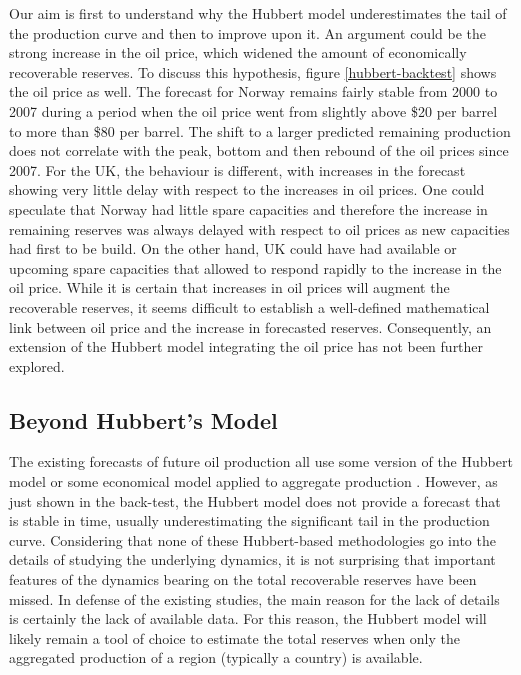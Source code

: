 \documentclass[review]{elsarticle}
\begin{document}
Our aim is first to understand why the Hubbert model underestimates the tail of the production curve and then to improve upon it. An argument could be the strong increase in the oil price, which widened the amount of economically recoverable reserves. To discuss this hypothesis, figure \ref{hubbert-backtest} shows the oil price as well. The forecast for Norway remains fairly stable from 2000 to 2007 during a period when the oil
price went from slightly above \$20 per barrel to more than \$80 per barrel. The shift to a larger predicted
remaining production does not correlate with the peak, bottom and then rebound of the oil prices
since 2007. For the UK, the behaviour is different, with increases in the forecast showing very little delay with respect to the increases in oil prices. One could speculate that Norway had little spare capacities and therefore the increase in remaining reserves was always delayed with respect to oil prices as new capacities had first to be build. On the other hand, UK could have had available or upcoming spare capacities that allowed to respond rapidly to the increase in the oil price. While it is certain that increases in oil prices will augment the recoverable reserves, it seems difficult to establish a well-defined mathematical link between oil price and the increase in forecasted reserves. Consequently, an extension of the Hubbert model integrating the oil price has not been further explored.


\subsection{Beyond Hubbert's Model}

The existing forecasts of future oil production all use some version of the
Hubbert model \citep{Brecha2012,Laherrere2002,Lynch2002}
or some economical model applied to aggregate production \citep{Greiner2011}.
 However, as just shown in the back-test, the Hubbert model does not provide a
forecast that is stable in time, usually underestimating the significant tail in the production curve.
Considering that none of these Hubbert-based methodologies go into the details of studying the underlying dynamics, it is not surprising that important features of the dynamics bearing
on the total recoverable reserves have been missed.
In defense of the existing studies, the main reason for the lack of details is certainly the lack of available data. For this reason, the Hubbert model will likely remain a tool of choice to estimate the total reserves when only the aggregated production of a region (typically a country) is available. 
\end{document}
